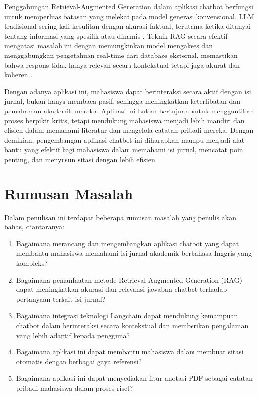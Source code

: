 Penggabungan Retrieval-Augmented Generation dalam aplikasi chatbot berfungsi untuk memperluas batasan yang melekat pada model generasi konvensional. LLM tradisional sering kali kesulitan dengan akurasi faktual, terutama ketika ditanyai tentang informasi yang spesifik atau dinamis \citep{wang2024mememo,lewis2020retrieval}. Teknik RAG secara efektif mengatasi masalah ini dengan memungkinkan model mengakses dan menggabungkan pengetahuan real-time dari database eksternal, memastikan bahwa respons tidak hanya relevan secara kontekstual tetapi juga akurat dan koheren \citep{lewis2020retrieval}.

Dengan adanya aplikasi ini, mahasiswa dapat berinteraksi secara aktif dengan isi jurnal, bukan hanya membaca pasif, sehingga meningkatkan keterlibatan dan pemahaman akademik mereka. Aplikasi ini bukan bertujuan untuk menggantikan proses berpikir kritis, tetapi mendukung mahasiswa menjadi lebih mandiri dan efisien dalam memahami literatur dan mengelola catatan pribadi mereka. Dengan demikian, pengembangan aplikasi chatbot ini diharapkan mampu menjadi alat bantu yang efektif bagi mahasiswa dalam memahami isi jurnal, mencatat poin penting, dan menyusun sitasi dengan lebih efisien

\section{Rumusan Masalah}
Dalam penulisan ini terdapat beberapa rumusan masalah yang penulis akan bahas, diantaranya:
\begin{enumerate}
  \item Bagaimana merancang dan mengembangkan aplikasi chatbot yang dapat membantu mahasiswa memahami isi jurnal akademik berbahasa Inggris yang kompleks?
        \raggedright
  \item Bagaimana pemanfaatan metode Retrieval-Augmented Generation (RAG) dapat meningkatkan akurasi dan relevansi jawaban chatbot terhadap pertanyaan terkait isi jurnal?
  \item Bagaimana integrasi teknologi Langchain dapat mendukung kemampuan chatbot dalam berinteraksi secara kontekstual dan memberikan pengalaman yang lebih adaptif kepada pengguna?
  \item Bagaimana aplikasi ini dapat membantu mahasiswa dalam membuat sitasi otomatis dengan berbagai gaya referensi?
  \item Bagaimana aplikasi ini dapat menyediakan fitur anotasi PDF sebagai catatan pribadi mahasiswa dalam proses riset?
\end{enumerate}

